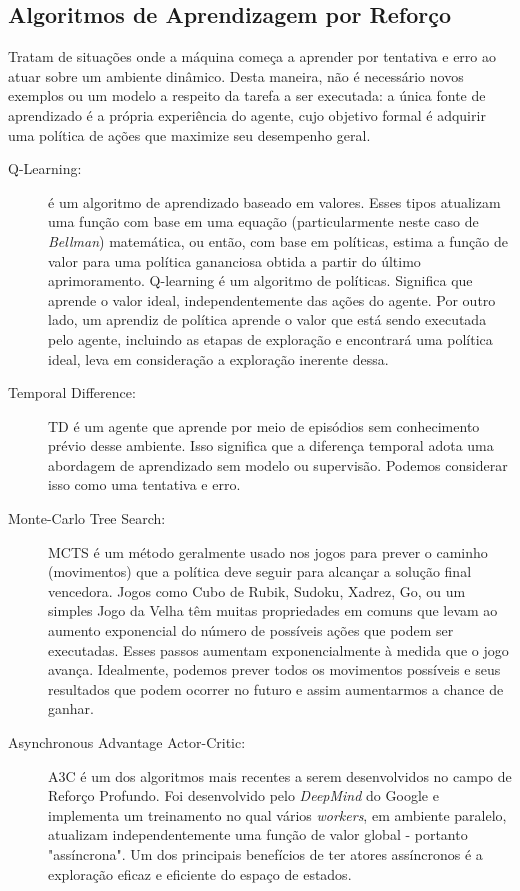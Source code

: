 \subsection{Algoritmos de Aprendizagem por Reforço}
Tratam de situações onde a máquina começa a aprender por tentativa e erro ao atuar sobre um ambiente dinâmico. Desta maneira, não é necessário novos exemplos ou um modelo a respeito da tarefa a ser executada: a única fonte de aprendizado é a própria experiência do agente, cujo objetivo formal é adquirir uma política de ações que maximize seu desempenho geral.
\begin{description}
	\item[Q-Learning:] é um algoritmo de aprendizado baseado em valores. Esses tipos atualizam uma função com base em uma equação (particularmente neste caso de \textit{Bellman}) matemática, ou então, com base em políticas, estima a função de valor para uma política gananciosa obtida a partir do último aprimoramento. Q-learning é um algoritmo de políticas. Significa que aprende o valor ideal, independentemente das ações do agente. Por outro lado, um aprendiz de política aprende o valor que está sendo executada pelo agente, incluindo as etapas de exploração e encontrará uma política ideal, leva em consideração a exploração inerente dessa.
	\item[Temporal Difference:] TD é um agente que aprende por meio de episódios sem conhecimento prévio desse ambiente. Isso significa que a diferença temporal adota uma abordagem de aprendizado sem modelo ou supervisão. Podemos considerar isso como uma tentativa e erro.
	\item[Monte-Carlo Tree Search:] MCTS é um método geralmente usado nos jogos para prever o caminho (movimentos) que a política deve seguir para alcançar a solução final vencedora. Jogos como Cubo de Rubik, Sudoku, Xadrez, Go, ou um simples Jogo da Velha têm muitas propriedades em comuns que levam ao aumento exponencial do número de possíveis ações que podem ser executadas. Esses passos aumentam exponencialmente à medida que o jogo avança. Idealmente, podemos prever todos os movimentos possíveis e seus resultados que podem ocorrer no futuro e assim aumentarmos a chance de ganhar.
	\item[Asynchronous Advantage Actor-Critic:] A3C é um dos algoritmos mais recentes a serem desenvolvidos no campo de Reforço Profundo. Foi desenvolvido pelo \textit{DeepMind} do Google e implementa um treinamento no qual vários \textit{workers}, em ambiente paralelo, atualizam independentemente uma função de valor global - portanto "assíncrona". Um dos principais benefícios de ter atores assíncronos é a exploração eficaz e eficiente do espaço de estados.
\end{description}

